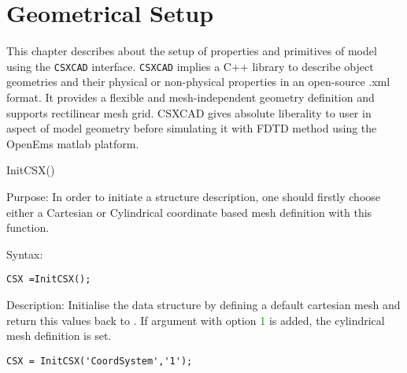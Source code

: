 \chapter{Geometrical Setup}\label{chap-CSXCAD}
	This chapter describes about the setup of properties and primitives of model using the \texttt{CSXCAD} interface. \texttt{CSXCAD} implies a C++ library to describe object geometries and their physical or non-physical properties in an open-source .xml format.  It provides a flexible and mesh-independent geometry definition and supports rectilinear mesh grid. CSXCAD gives absolute liberality to user in aspect of model geometry before simulating it with FDTD method using the OpenEms matlab platform. 
 
\begin{FontNameFunct}{InitCSX()}
 \label{InitCSX}
\end{FontNameFunct}

\begin{FontDescr}{Purpose:}
In order to initiate a structure description, one should firstly choose either a Cartesian or Cylindrical coordinate based mesh definition with this function.
\end{FontDescr}

\begin{FontDescr}{Syntax:}
 \begin{lstlisting}
CSX =InitCSX();
 \end{lstlisting}
 \end{FontDescr}
 
\begin{FontDescr}{Description:}
  Initialise the  data structure by defining a default cartesian mesh and return this values back to . If argument  with option \textcolor{green}{1} is added, the cylindrical mesh definition is set. 
  \begin{lstlisting}
CSX = InitCSX('CoordSystem','1');
  \end{lstlisting}
\end{FontDescr}
   

 

 \label{CSXprimitives} 

